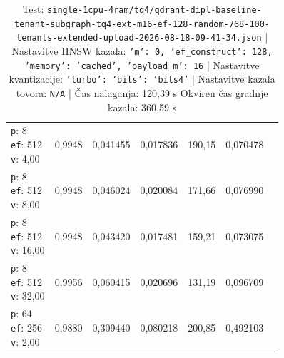 \begin{table}[htbp]
\begin{tabularx}{\textwidth}{Xrrrrrr}
    \makecell{\texttt{p}: 8\\\texttt{ef}: 512\\\texttt{v}: 4,00} & 0,9948 & 0,041455 & 0,017836 & 190,15 & 0,070478 \\
    \makecell{\texttt{p}: 8\\\texttt{ef}: 512\\\texttt{v}: 8,00} & 0,9948 & 0,046024 & 0,020084 & 171,66 & 0,076990 \\
    \makecell{\texttt{p}: 8\\\texttt{ef}: 512\\\texttt{v}: 16,00} & 0,9948 & 0,043420 & 0,017481 & 159,21 & 0,073075 \\
    \makecell{\texttt{p}: 8\\\texttt{ef}: 512\\\texttt{v}: 32,00} & 0,9956 & 0,060415 & 0,020696 & 131,19 & 0,096709 \\
    \makecell{\texttt{p}: 64\\\texttt{ef}: 256\\\texttt{v}: 2,00} & 0,9880 & 0,309440 & 0,080218 & 200,85 & 0,492103 \\
    \bottomrule
  \end{tabularx}
\caption* {Test: \texttt{single-1cpu-4ram/tq4/qdrant-dipl-baseline-tenant-subgraph-tq4-ext-m16-ef-128-random-768-100-tenants-extended-upload-2026-08-18-09-41-34.json} | Nastavitve HNSW kazala: \texttt{{'m': 0, 'ef\_construct': 128, 'memory': 'cached', 'payload\_m': 16}} | Nastavitve kvantizacije: \texttt{{'turbo': {'bits': 'bits4'}}} | Nastavitve kazala tovora: \texttt{N/A} | Čas nalaganja: 120,39 s Okviren čas gradnje kazala: 360,59 s}\end{table}


